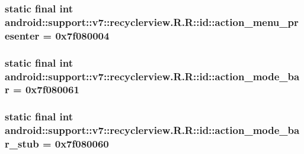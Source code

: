 \hypertarget{classandroid_1_1support_1_1v7_1_1recyclerview_1_1_r_1_1id_ba28052ab1d679fc72cbbe8e106fe0c3}{
\subsubsection[{action\_\-menu\_\-presenter}]{\setlength{\rightskip}{0pt plus 5cm}static final int android::support::v7::recyclerview.R.R::id::action\_\-menu\_\-presenter = 0x7f080004}}
\label{classandroid_1_1support_1_1v7_1_1recyclerview_1_1_r_1_1id_ba28052ab1d679fc72cbbe8e106fe0c3}


\hypertarget{classandroid_1_1support_1_1v7_1_1recyclerview_1_1_r_1_1id_9f215fb28f94860426fd40501b69ce3c}{
\subsubsection[{action\_\-mode\_\-bar}]{\setlength{\rightskip}{0pt plus 5cm}static final int android::support::v7::recyclerview.R.R::id::action\_\-mode\_\-bar = 0x7f080061}}
\label{classandroid_1_1support_1_1v7_1_1recyclerview_1_1_r_1_1id_9f215fb28f94860426fd40501b69ce3c}


\hypertarget{classandroid_1_1support_1_1v7_1_1recyclerview_1_1_r_1_1id_cdbbf9c0da787c992c0177166ffb52f4}{
\subsubsection[{action\_\-mode\_\-bar\_\-stub}]{\setlength{\rightskip}{0pt plus 5cm}static final int android::support::v7::recyclerview.R.R::id::action\_\-mode\_\-bar\_\-stub = 0x7f080060}}
\label{classandroid_1_1support_1_1v7_1_1recyclerview_1_1_r_1_1id_cdbbf9c0da787c992c0177166ffb52f4}


